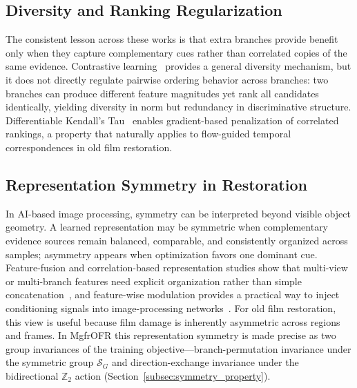 \subsection{Diversity and Ranking Regularization}
\label{subsec:diversity_ranking}

The consistent lesson across these works is that extra branches provide benefit only when they capture complementary cues rather than correlated copies of the same evidence. Contrastive learning~\cite{chen2020mocov2} provides a general diversity mechanism, but it does not directly regulate pairwise ordering behavior across branches: two branches can produce different feature magnitudes yet rank all candidates identically, yielding diversity in norm but redundancy in discriminative structure. Differentiable Kendall's Tau~\cite{zheng2023diffkendall} enables gradient-based penalization of correlated rankings, a property that naturally applies to flow-guided temporal correspondences in old film restoration.

\subsection{Representation Symmetry in Restoration}
\label{subsec:symmetry_ai}

In AI-based image processing, symmetry can be interpreted beyond visible object geometry. A learned representation may be symmetric when complementary evidence sources remain balanced, comparable, and consistently organized across samples; asymmetry appears when optimization favors one dominant cue. Feature-fusion and correlation-based representation studies show that multi-view or multi-branch features need explicit organization rather than simple concatenation~\cite{yu2021multiview_tensor_fusion,qian2020multiview_matrix_correlation}, and feature-wise modulation provides a practical way to inject conditioning signals into image-processing networks~\cite{perez2018film}. For old film restoration, this view is useful because film damage is inherently asymmetric across regions and frames. In MgfrOFR this representation symmetry is made precise as two group invariances of the training objective---branch-permutation invariance under the symmetric group $\mathcal{S}_G$ and direction-exchange invariance under the bidirectional $\mathbb{Z}_2$ action (Section~\ref{subsec:symmetry_property}).

